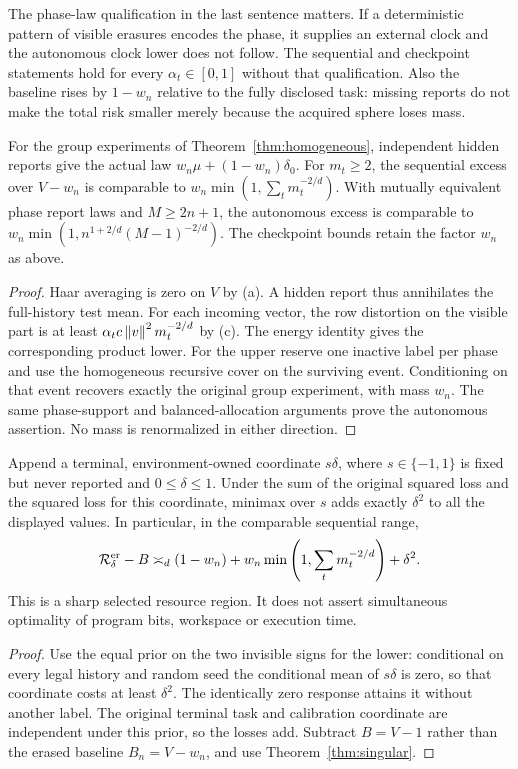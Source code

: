 The phase-law qualification in the last sentence matters. If a deterministic pattern of visible erasures encodes the phase, it supplies an external clock and the autonomous clock lower does not follow. The sequential and checkpoint statements hold for every $\alpha_t\in[0,1]$ without that qualification. Also the baseline rises by $1-w_n$ relative to the fully disclosed task: missing reports do not make the total risk smaller merely because the acquired sphere loses mass.

\begin{corollary}\label{cor:homogeneous-singular}
For the group experiments of Theorem~\ref{thm:homogeneous}, independent hidden reports give the actual law $w_n\mu+(1-w_n)\delta_0$. For $m_t\ge2$, the sequential excess over $V-w_n$ is comparable to
$w_n\min(1,\sum_t m_t^{-2/d})$.
With mutually equivalent phase report laws and $M\ge2n+1$, the autonomous excess is comparable to $w_n\min(1,n^{1+2/d}(M-1)^{-2/d})$. The checkpoint bounds retain the factor $w_n$ as above.
\end{corollary}
\begin{proof}
Haar averaging is zero on $V$ by (a). A hidden report thus annihilates the full-history test mean. For each incoming vector, the row distortion on the visible part is at least $\alpha_t c\left\lVert v\right\rVert^2m_t^{-2/d}$ by (c). The energy identity gives the corresponding product lower. For the upper reserve one inactive label per phase and use the homogeneous recursive cover on the surviving event. Conditioning on that event recovers exactly the original group experiment, with mass $w_n$. The same phase-support and balanced-allocation arguments prove the autonomous assertion. No mass is renormalized in either direction.
\end{proof}

\begin{corollary}\label{cor:singular-calibration}
Append a terminal, environment-owned coordinate $s\delta$, where $s\in\{-1,1\}$ is fixed but never reported and $0\le\delta\le1$. Under the sum of the original squared loss and the squared loss for this coordinate, minimax over $s$ adds exactly $\delta^2$ to all the displayed values. In particular, in the comparable sequential range,
\begin{equation}\label{eq:joint-sharp}
 \mathcal R^{\rm er}_\delta-B
 \asymp_d (1-w_n)+w_n\min\left(1,\sum_t m_t^{-2/d}\right)+\delta^2.
\end{equation}
This is a sharp selected resource region. It does not assert simultaneous optimality of program bits, workspace or execution time.
\end{corollary}
\begin{proof}
Use the equal prior on the two invisible signs for the lower: conditional on every legal history and random seed the conditional mean of $s\delta$ is zero, so that coordinate costs at least $\delta^2$. The identically zero response attains it without another label. The original terminal task and calibration coordinate are independent under this prior, so the losses add. Subtract $B=V-1$ rather than the erased baseline $B_n=V-w_n$, and use Theorem~\ref{thm:singular}.
\end{proof}
